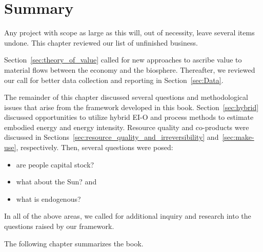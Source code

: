 \section{Summary}
\label{sec:unfinished_summary}

Any project with scope as large as this will, out of necessity, leave
several items undone.
This chapter reviewed our list of unfinished business.

Section~\ref{sec:theory_of_value} called for new approaches
to ascribe value to material flows between the economy and the biosphere.
Thereafter, we reviewed our call for better data collection and reporting
in Section~\ref{sec:Data}.

The remainder of this chapter discussed several questions
and methodological issues that arise from the framework
developed in this book.
Section~\ref{sec:hybrid} discussed opportunities to utilize hybrid EI-O and process methods
to estimate embodied energy and energy intensity.
Resource quality and co-products were discussed 
in Sections~\ref{sec:resource_quality_and_irreversibility}
and~\ref{sec:make-use}, respectively.
Then, several questions were posed:
\begin{itemize}
	\item{are people capital stock?}
	
	\item{what about the Sun? and}
	
	\item{what is endogenous?}
\end{itemize}

\noindent{}In all of the above areas, we called for additional 
inquiry and research 
into the questions raised by our framework.

The following chapter summarizes the book. 








